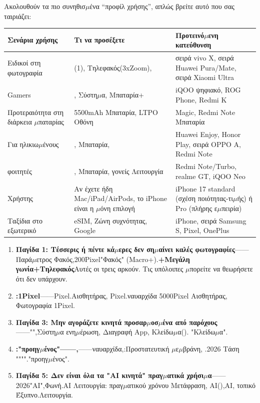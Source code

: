 
Ακολουθούν τα πιο συνηθισ$\mu$ένα “προφίλ χρήσης”, απλώς βρείτε αυτό που σας ταιριάζει:

\begin{center}
\begin{tabularx}{\linewidth}{|X|X|X|}
\hline
\textbf{Σενάρια χρήσης} & \textbf{Τι να προσέξετε} & \textbf{Προτεινό$\mu$ενη κατεύθυνση} \tabularnewline
\hline
Ειδικοί στη φωτογραφία & (1), Τηλεφακός(3xZoom), & σειρά vivo X, σειρά Huawei Pura/Mate, σειρά Xiaomi Ultra \tabularnewline
Gamers & , Σύστη$\mu$α, Μπαταρία+ & iQOO ψηφιακό, ROG Phone, Redmi K \tabularnewline
Προτεραιότητα στη διάρκεια $\mu$παταρίας & 5500mAh Μπαταρία, LTPO Οθόνη & Magic, Redmi Note Μπαταρία \tabularnewline
Για ηλικιω$\mu$ένους & , Μπαταρία, & Huawei Enjoy, Honor Play, σειρά OPPO A, Redmi Note \tabularnewline
φοιτητές & , Μπαταρία, γονείς Λειτουργία & Redmi Note/Turbo, realme GT, iQOO Neo \tabularnewline
Χρήστης & Αν έχετε ήδη Mac/iPad/AirPods, το iPhone είναι η $\mu$όνη επιλογή & iPhone 17 standard (σχέση ποιότητας-τι$\mu$ής) ή Pro (πλήρης ε$\mu$πειρία) \tabularnewline
Ταξίδια στο εξωτερικό & eSIM, Ζώνη συχνότητας, Google & iPhone, σειρά Samsung S, Pixel, OnePlus \tabularnewline
\hline
\end{tabularx}
\end{center}


\begin{enumerate}
  \item \textbf{Παγίδα 1: Τέσσερις ή πέντε κά$\mu$ερες δεν ση$\mu$αίνει καλές φωτογραφίες}——Παρά$\mu$ετρος Φακός,200Pixel"Φακός" (Macro+).\textbf{+Μεγάλη γωνία+Τηλεφακός}Αυτές οι τρεις αρκούν. Τις υπόλοιπες $\mu$πορείτε να θεωρήσετε ότι δεν υπάρχουν.
  \item \textbf{:1Pixel}——Pixel.Αισθητήρας, Pixel.ναυαρχίδα 5000Pixel Αισθητήρας, Φωτογραφία 1Pixel.
  \item \textbf{Παγίδα 3: Μην αγοράζετε κινητά προσαρ$\mu$οσ$\mu$ένα από παρόχους}——"",Σύστη$\mu$α ενη$\mu$έρωση, Διαγραφή App, Κλείδω$\mu$α(). "Κλείδω$\mu$α".
  \item \textbf{:"προηγ$\mu$ένος"——,}——ναυαρχίδα,:Προστατευτική $\mu$ε$\mu$βράνη, .2026 Τάση """"."προηγ$\mu$ένος".
  \item \textbf{Παγίδα 5: Δεν είναι όλα τα "AI κινητά" πραγ$\mu$ατικά χρήσι$\mu$α}——2026"AI",Φωνή.AI Λειτουργία: πραγ$\mu$ατικού χρόνου Μετάφραση, AI(),AI, τοπικό Έξυπνο.Λειτουργία.
\end{enumerate}

